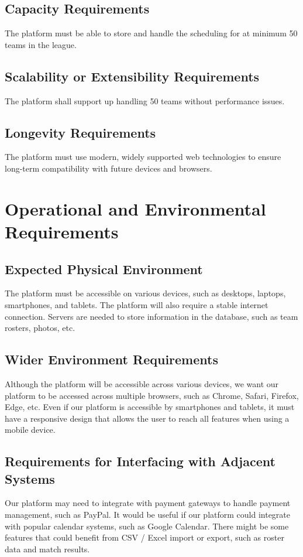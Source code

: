 \documentclass[12pt]{article}
\begin{document}
\subsection{Capacity Requirements}
The platform must be able to store and handle the scheduling for at minimum 50 teams in the league.

\subsection{Scalability or Extensibility Requirements}
The platform shall support up handling 50 teams without performance issues.

\subsection{Longevity Requirements}
The platform must use modern, widely supported web technologies to ensure long-term compatibility with future devices and browsers.

\section{Operational and Environmental Requirements}
\subsection{Expected Physical Environment}
The platform must be accessible on various devices, such as desktops, laptops, smartphones, and tablets.
The platform will also require a stable internet connection.
Servers are needed to store information in the database, such as team rosters, photos, etc.

\subsection{Wider Environment Requirements}
Although the platform will be accessible across various devices, we want our platform to be accessed across multiple browsers, such as Chrome, Safari, Firefox, Edge, etc.
Even if our platform is accessible by smartphones and tablets, it must have a responsive design that allows the user to reach all features when using a mobile device.

\subsection{Requirements for Interfacing with Adjacent Systems}
Our platform may need to integrate with payment gateways to handle payment management, such as PayPal.
It would be useful if our platform could integrate with popular calendar systems, such as Google Calendar.
There might be some features that could benefit from CSV / Excel import or export, such as roster data and match results.
\end{document}
